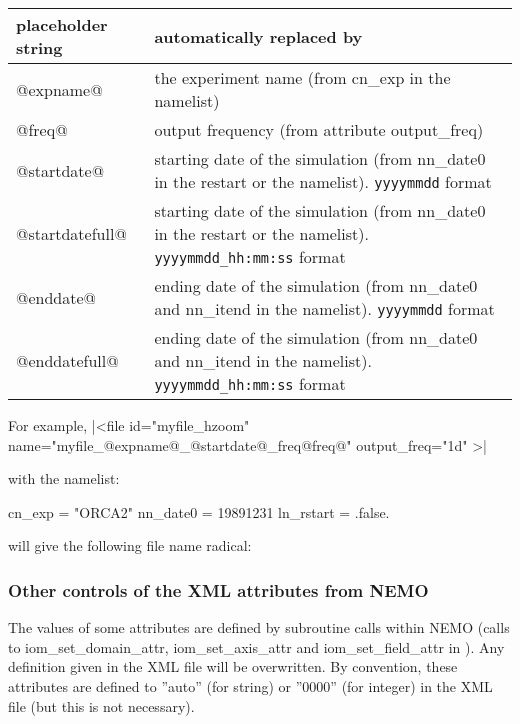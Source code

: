 \documentclass[../tex_main/NEMO_manual]{subfiles}
\begin{document}
\begin{table} \scriptsize
	\begin{tabularx}{\textwidth}{|lX|} \hline
		\centering placeholder string &
		automatically replaced by                          \\ \hline \hline
		\centering @expname@          &
		the experiment name (from cn\_exp in the namelist) \\ \hline
		\centering @freq@             &
		output frequency (from attribute output\_freq)     \\ \hline
		\centering @startdate@        &
		starting date of the simulation (from nn\_date0 in the restart or the namelist). \newline
		\verb?yyyymmdd?          format                   \\ \hline
		\centering @startdatefull@    &
		starting date of the simulation (from nn\_date0 in the restart or the namelist). \newline
		\verb?yyyymmdd_hh:mm:ss? format                    \\ \hline
		\centering @enddate@          &
		ending date of the simulation   (from nn\_date0 and nn\_itend  in the namelist). \newline
		\verb?yyyymmdd?          format                    \\ \hline
		\centering @enddatefull@      &
		ending date of the simulation   (from nn\_date0 and nn\_itend  in the namelist). \newline
		\verb?yyyymmdd_hh:mm:ss? format                    \\ \hline
	\end{tabularx}
\end{table}

\noindent For example, 
\xmlline|<file id="myfile_hzoom" name="myfile_@expname@_@startdate@_freq@freq@" output_freq="1d" >|

\noindent with the namelist:
\begin{forlines}
cn_exp    = "ORCA2"
nn_date0  = 19891231
ln_rstart = .false.
\end{forlines}

\noindent will give the following file name radical: 

\subsubsection{Other controls of the XML attributes from NEMO}

The values of some attributes are defined by subroutine calls within NEMO 
(calls to iom\_set\_domain\_attr, iom\_set\_axis\_attr and iom\_set\_field\_attr in ).
Any definition given in the XML file will be overwritten.
By convention, these attributes are defined to ''auto'' (for string) or ''0000'' (for integer) in the XML file
(but this is not necessary).
\\
\end{document}
